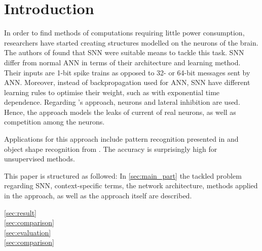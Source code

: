 \section{Introduction}

In order to find methods of computations requiring little power consumption, researchers have started creating structures modelled on the neurons of the brain.
The authors of \cite{SNN} found that \acs{SNN} were suitable means to tackle this task.
\acs{SNN} differ from normal \acs{ANN} in terms of their architecture and learning method.
Their inputs are 1-bit spike trains as opposed to 32- or 64-bit messages sent by \acs{ANN}.
Moreover, instead of backpropagation used for \acs{ANN}, \acs{SNN} have different learning rules to optimise their weight, such as  with exponential time dependence.
Regarding \cite{SNN}'s approach,  neurons and lateral inhibition are used.
Hence, the approach models the leaks of current of real neurons, as well as competition among the neurons.

Applications for this approach include pattern recognition presented in \cite{SNN} and object shape recognition from \cite{object_detection_SNN}.
The accuracy is surprisingly high for unsupervised methods.

This paper is structured as followed:
In \autoref{sec:main_part} the tackled problem regarding \acs{SNN}, context-specific terms, the network architecture, methods applied in the approach, as well as the approach itself are described.

\textcolor{red}{\autoref{sec:result}\\
\autoref{sec:comparison}\\
\autoref{sec:evaluation}\\
\autoref{sec:comparison}}
